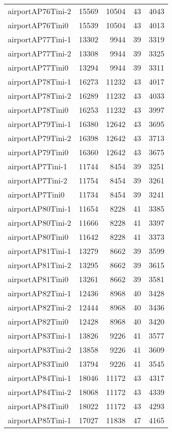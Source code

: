 \begin{longtable}{lrrrr}
airportAP76Tini-2 & 15569 & 10504 & 43 & 4043 \\
airportAP76Tini0 & 15539 & 10504 & 43 & 4013 \\
airportAP77Tini-1 & 13302 & 9944 & 39 & 3319 \\
airportAP77Tini-2 & 13308 & 9944 & 39 & 3325 \\
airportAP77Tini0 & 13294 & 9944 & 39 & 3311 \\
airportAP78Tini-1 & 16273 & 11232 & 43 & 4017 \\
airportAP78Tini-2 & 16289 & 11232 & 43 & 4033 \\
airportAP78Tini0 & 16253 & 11232 & 43 & 3997 \\
airportAP79Tini-1 & 16380 & 12642 & 43 & 3695 \\
airportAP79Tini-2 & 16398 & 12642 & 43 & 3713 \\
airportAP79Tini0 & 16360 & 12642 & 43 & 3675 \\
airportAP7Tini-1 & 11744 & 8454 & 39 & 3251 \\
airportAP7Tini-2 & 11754 & 8454 & 39 & 3261 \\
airportAP7Tini0 & 11734 & 8454 & 39 & 3241 \\
airportAP80Tini-1 & 11654 & 8228 & 41 & 3385 \\
airportAP80Tini-2 & 11666 & 8228 & 41 & 3397 \\
airportAP80Tini0 & 11642 & 8228 & 41 & 3373 \\
airportAP81Tini-1 & 13279 & 8662 & 39 & 3599 \\
airportAP81Tini-2 & 13295 & 8662 & 39 & 3615 \\
airportAP81Tini0 & 13261 & 8662 & 39 & 3581 \\
airportAP82Tini-1 & 12436 & 8968 & 40 & 3428 \\
airportAP82Tini-2 & 12444 & 8968 & 40 & 3436 \\
airportAP82Tini0 & 12428 & 8968 & 40 & 3420 \\
airportAP83Tini-1 & 13826 & 9226 & 41 & 3577 \\
airportAP83Tini-2 & 13858 & 9226 & 41 & 3609 \\
airportAP83Tini0 & 13794 & 9226 & 41 & 3545 \\
airportAP84Tini-1 & 18046 & 11172 & 43 & 4317 \\
airportAP84Tini-2 & 18068 & 11172 & 43 & 4339 \\
airportAP84Tini0 & 18022 & 11172 & 43 & 4293 \\
airportAP85Tini-1 & 17027 & 11838 & 47 & 4165 \\

\end{longtable}
